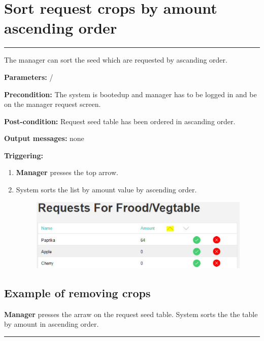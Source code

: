 \section{Sort request crops by amount ascending order}

\hrule
\hfill
\vspace{0.5cm}

\label{operation:sortSeedRequest}

The manager can sort the seed which are requested by ascanding order.
\begin{description}

\item \textbf{Parameters:} /
\item \textbf{Precondition:} The system is bootedup and manager has to be
logged in and be on the manager request screen.
\item \textbf{Post-condition:} Request seed table has been ordered in ascanding
order.

\item \textbf{Output messages:} none
\item \textbf{Triggering:}
\begin{enumerate}
\item \textbf{Manager} presses the top arrow.
\item System sorts the list by amount value by ascending order.
\begin{figure}[H]
\includegraphics[width=1\textwidth]{images/RequestByAscendingOrderManager.eps}
\end{figure}
\end{enumerate}
\end{description}

\subsection{Example of removing crops}
\textbf{Manager} presses the arraw on the request seed table. System sorts the
the table by amount in ascending order.

\hfill
\vspace{0.5cm}
\hrule

